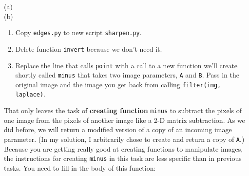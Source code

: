 \begin{marginfigure}
\begin{center}
(a) \\
(b) 
\end{center}
\caption{Bonkers the cat portrait. (a) original and (b) sharpened as computed by {\tt sharpen.py}.}
\label{jeepedges}
\end{marginfigure}

\begin{enumerate}
\item Copy {\tt edges.py} to new script {\tt sharpen.py}.
\item Delete function {\tt invert} because we don't need it.
\item  Replace the line that calls {\tt point} with a call to a new function we'll create shortly called {\tt minus} that takes two image parameters, {\tt A} and {\tt B}. Pass in the original image and the image you get back from calling {\tt filter(img, laplace)}.
\end{enumerate}

That only leaves the task of {\bf creating function} {\tt minus} to subtract the pixels of one image from the pixels of another image like a 2-D matrix subtraction.  As we did before, we will return a modified version of a copy of an incoming image parameter. (In my solution, I arbitrarily chose to create and return a copy of {\tt A}.) Because you are getting really good at creating functions to manipulate images, the instructions for creating {\tt minus} in this  task are less specific than in previous tasks.  You need to fill in the body of this function:
 
